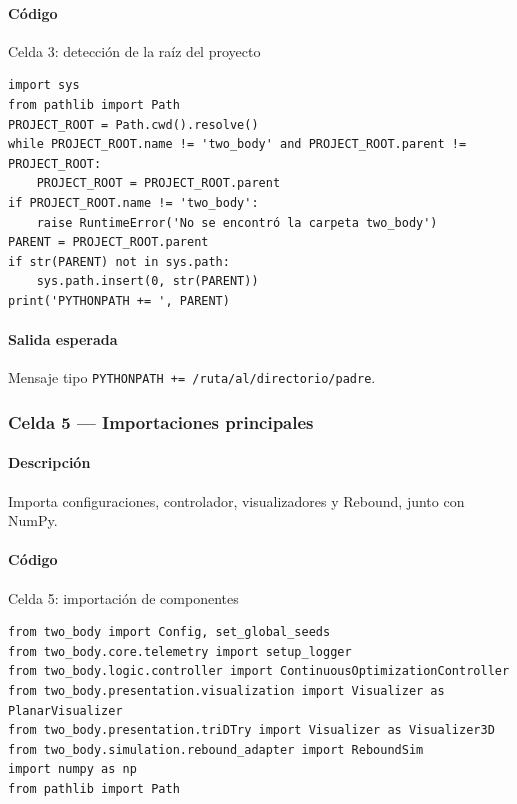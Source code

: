 \paragraph{Código}
\par\smallskip
\begin{listing}[H]
\caption{Celda 3: detección de la raíz del proyecto}
\begin{adjustbox}{max width=\textwidth}
\begin{minipage}{\textwidth}
\begin{verbatim}
import sys
from pathlib import Path
PROJECT_ROOT = Path.cwd().resolve()
while PROJECT_ROOT.name != 'two_body' and PROJECT_ROOT.parent != PROJECT_ROOT:
    PROJECT_ROOT = PROJECT_ROOT.parent
if PROJECT_ROOT.name != 'two_body':
    raise RuntimeError('No se encontró la carpeta two_body')
PARENT = PROJECT_ROOT.parent
if str(PARENT) not in sys.path:
    sys.path.insert(0, str(PARENT))
print('PYTHONPATH += ', PARENT)
\end{verbatim}
\end{minipage}
\end{adjustbox}
\end{listing}
\paragraph{Salida esperada} Mensaje tipo \texttt{PYTHONPATH += /ruta/al/directorio/padre}.

\subsubsection*{Celda 5 — Importaciones principales}
\paragraph{Descripción} Importa configuraciones, controlador, visualizadores y Rebound, junto con NumPy.
\paragraph{Código}
\par\smallskip
\begin{listing}[H]
\caption{Celda 5: importación de componentes}
\begin{adjustbox}{max width=\textwidth}
\begin{minipage}{\textwidth}
\begin{verbatim}
from two_body import Config, set_global_seeds
from two_body.core.telemetry import setup_logger
from two_body.logic.controller import ContinuousOptimizationController
from two_body.presentation.visualization import Visualizer as PlanarVisualizer
from two_body.presentation.triDTry import Visualizer as Visualizer3D
from two_body.simulation.rebound_adapter import ReboundSim
import numpy as np
from pathlib import Path
\end{verbatim}
\end{minipage}
\end{adjustbox}
\end{listing}
